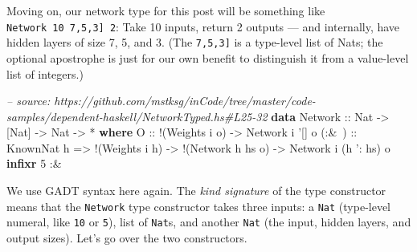 \documentclass[]{article}
\newenvironment{Shaded}{}{}
\newcommand{\KeywordTok}[1]{\textcolor[rgb]{0.00,0.44,0.13}{\textbf{{#1}}}}
\newcommand{\DataTypeTok}[1]{\textcolor[rgb]{0.56,0.13,0.00}{{#1}}}
\newcommand{\DecValTok}[1]{\textcolor[rgb]{0.25,0.63,0.44}{{#1}}}
\newcommand{\CharTok}[1]{\textcolor[rgb]{0.25,0.44,0.63}{{#1}}}
\newcommand{\CommentTok}[1]{\textcolor[rgb]{0.38,0.63,0.69}{\textit{{#1}}}}
\newcommand{\OtherTok}[1]{\textcolor[rgb]{0.00,0.44,0.13}{{#1}}}
\newcommand{\FunctionTok}[1]{\textcolor[rgb]{0.02,0.16,0.49}{{#1}}}
\newcommand{\NormalTok}[1]{{#1}}
\begin{document}
Moving on, our network type for this post will be something like
\texttt{Network\ 10\ \textquotesingle{}{[}7,5,3{]}\ 2}: Take 10 inputs, return 2
outputs --- and internally, have hidden layers of size 7, 5, and 3. (The
\texttt{\textquotesingle{}{[}7,5,3{]}} is a type-level list of Nats; the
optional \texttt{\textquotesingle{}} apostrophe is just for our own benefit to
distinguish it from a value-level list of integers.)

\begin{Shaded}
\begin{Highlighting}[]
\CommentTok{-- source: https://github.com/mstksg/inCode/tree/master/code-samples/dependent-haskell/NetworkTyped.hs#L25-32}
\KeywordTok{data} \DataTypeTok{Network}\OtherTok{ ::} \DataTypeTok{Nat} \OtherTok{->} \NormalTok{[}\DataTypeTok{Nat}\NormalTok{] }\OtherTok{->} \DataTypeTok{Nat} \OtherTok{->} \FunctionTok{*} \KeywordTok{where}
    \DataTypeTok{O}\OtherTok{     ::} \FunctionTok{!}\NormalTok{(}\DataTypeTok{Weights} \NormalTok{i o)}
          \OtherTok{->} \DataTypeTok{Network} \NormalTok{i }\CharTok{'[] o}
\OtherTok{    (:&~) ::} \DataTypeTok{KnownNat} \NormalTok{h}
          \OtherTok{=>} \FunctionTok{!}\NormalTok{(}\DataTypeTok{Weights} \NormalTok{i h)}
          \OtherTok{->} \FunctionTok{!}\NormalTok{(}\DataTypeTok{Network} \NormalTok{h hs o)}
          \OtherTok{->} \DataTypeTok{Network} \NormalTok{i (h }\CharTok{': hs) o}
\KeywordTok{infixr} \DecValTok{5} \FunctionTok{:&~}
\end{Highlighting}
\end{Shaded}

We use GADT syntax here again. The \emph{kind signature} of the type constructor
means that the \texttt{Network} type constructor takes three inputs: a
\texttt{Nat} (type-level numeral, like \texttt{10} or \texttt{5}), list of
\texttt{Nat}s, and another \texttt{Nat} (the input, hidden layers, and output
sizes). Let's go over the two constructors.
\end{document}
